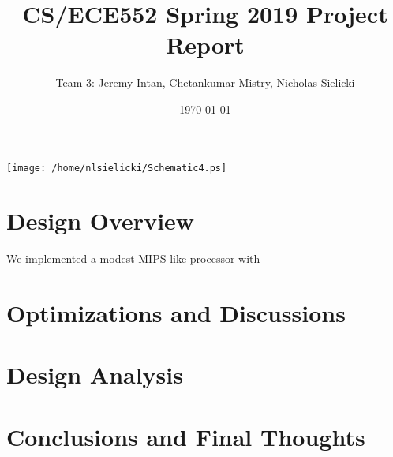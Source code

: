 \documentclass[11pt]{article}
\author{Team 3: Jeremy Intan, Chetankumar Mistry, Nicholas Sielicki}
\date{\today}
\title{CS/ECE552 Spring 2019 Project Report}
\begin{document}
\maketitle
\tableofcontents

\begin{center}
\texttt{[image: /home/nlsielicki/Schematic4.ps]}
\end{center}

\section{Design Overview}
\label{sec:org431e081}

We implemented a modest MIPS-like processor with 


\section{Optimizations and Discussions}
\label{sec:org13bb6cb}

\section{Design Analysis}
\label{sec:org7aeb14e}

\section{Conclusions and Final Thoughts}
\label{sec:orgd26758f}
\end{document}
